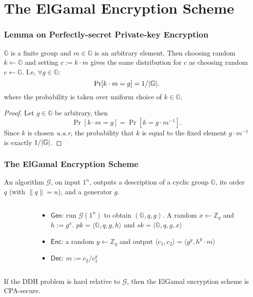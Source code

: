 \section{The ElGamal Encryption Scheme}
\begin{frame}\frametitle{Lemma on Perfectly-secret Private-key Encryption}
\begin{lemma}\label{lem:ps}
$\mathbb{G}$ is a finite group and $m\in \mathbb{G}$ is an arbitrary element. Then choosing random $k \gets \mathbb{G}$ and setting $c := k\cdot m$ gives the same distribution for $c$ as choosing random $c \gets \mathbb{G}$. I.e, $\forall g \in \mathbb{G}$:
\[ \Pr[k\cdot m = g] = 1/\lvert\mathbb{G}\rvert. \]
where the probability is taken over uniform choice of $k \in \mathbb{G}.$
\end{lemma}
\begin{proof}
Let $g \in \mathbb{G}$ be arbitrary, then
\[\Pr[k\cdot m = g] = \Pr[k = g\cdot m^{-1}]. \]
Since $k$ is chosen \emph{u.a.r}, the probability that $k$ is equal to the fixed element $g\cdot m^{-1}$ is exactly $1/\lvert\mathbb{G}\rvert$.
\end{proof}
\end{frame}
\begin{frame}\frametitle{The ElGamal Encryption Scheme}
An algorithm $\mathcal{G}$, on input $1^n$, outputs a description of a cyclic group $\mathbb{G}$, its order $q$ (with $\|q\| = n$), and a generator $g$.
\begin{columns}[]
\begin{column}{5cm}
\begin{figure}
\begin{center}

\end{center}
\end{figure}
\end{column}
\begin{column}{6cm}
\begin{construction}
\begin{itemize}
\item $\mathsf{Gen}$: run $\mathcal{G}(1^n)$ to obtain $(\mathbb{G},q,g)$. A random $x \gets \mathbb{Z}_q$ and $h := g^x$.  $pk = \langle \mathbb{G},q,g,h \rangle$ and $sk = \langle \mathbb{G},q,g,x \rangle$
\item $\mathsf{Enc}$: a random $y \gets \mathbb{Z}_q$ and output $\langle c_1, c_2 \rangle = \langle g^y, h^y\cdot m\rangle$
\item $\mathsf{Dec}$: $m:=c_2/c_1^x$
\end{itemize}
\end{construction}
\end{column}
\end{columns}
\begin{theorem}
If the DDH problem is hard relative to $\mathcal{G}$, then the ElGamal encryption scheme is CPA-secure.
\end{theorem}
\end{frame}
